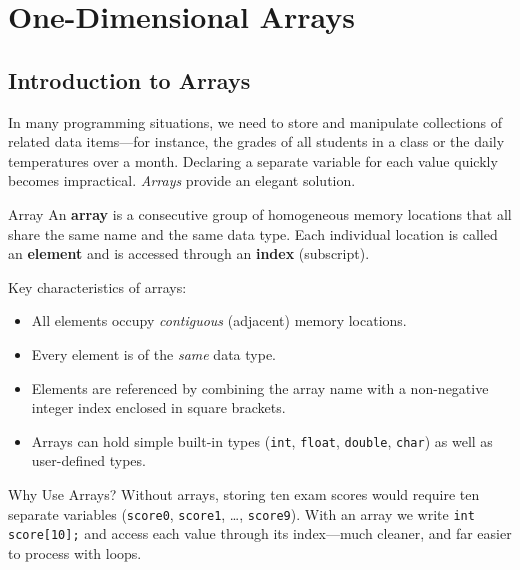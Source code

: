\chapter{One-Dimensional Arrays}
\label{ch:one-dimensional-arrays}

\section{Introduction to Arrays}
\label{sec:intro-arrays}

In many programming situations, we need to store and manipulate collections of
related data items---for instance, the grades of all students in a class or the
daily temperatures over a month. Declaring a separate variable for each value
quickly becomes impractical. \emph{Arrays} provide an elegant solution.

\begin{definitionbox}{Array}
An \textbf{array} is a consecutive group of homogeneous memory locations that
all share the same name and the same data type. Each individual location is
called an \textbf{element} and is accessed through an \textbf{index}
(subscript).
\end{definitionbox}

Key characteristics of arrays:
\begin{itemize}
    \item All elements occupy \emph{contiguous} (adjacent) memory locations.
    \item Every element is of the \emph{same} data type.
    \item Elements are referenced by combining the array name with a
          non-negative integer index enclosed in square brackets.
    \item Arrays can hold simple built-in types (\texttt{int}, \texttt{float},
          \texttt{double}, \texttt{char}) as well as user-defined types.
\end{itemize}

\begin{infobox}{Why Use Arrays?}
Without arrays, storing ten exam scores would require ten separate variables
(\texttt{score0}, \texttt{score1}, \ldots, \texttt{score9}). With an array we
write \texttt{int score[10];} and access each value through its index---much
cleaner, and far easier to process with loops.
\end{infobox}

